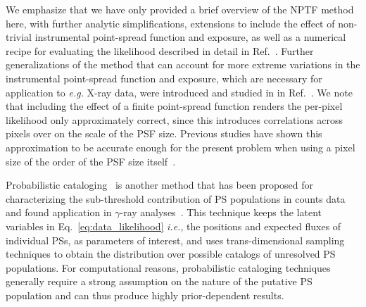 \documentclass[prd,aps,10pt,nofootinbib,twocolumn,superscriptaddress,preprintnumbers,balancelastpage,longbibliography]{revtex4-1}
\begin{document}
We emphasize that we have only provided a brief overview of the NPTF method here, with further analytic simplifications, extensions to include the effect of non-trivial instrumental point-spread function and exposure, as well as a numerical recipe for evaluating the likelihood described in detail in Ref.~\cite{Mishra-Sharma:2016gis}. Further generalizations of the method that can account for more extreme variations in the instrumental point-spread function and exposure, which are necessary for application to \emph{e.g.} X-ray data, were introduced and studied in in Ref.~\cite{Collin:2021ufc}. We note that including the effect of a finite point-spread function renders the per-pixel likelihood only approximately correct, since this introduces correlations across pixels over on the scale of the PSF size. Previous studies have shown this approximation to be accurate enough for the present problem when using a pixel size of the order of the PSF size itself~\cite{Chang:2019ars}. 

Probabilistic cataloging~\cite{2013AJ....146....7B,2021arXiv210202409L} is another method that has been proposed for characterizing the sub-threshold contribution of PS populations in counts data and found application in $\gamma$-ray analyses~\cite{Daylan:2016tia}. This technique keeps the latent variables in Eq.~\eqref{eq:data_likelihood} \emph{i.e.}, the positions and expected fluxes of individual PSs, as parameters of interest, and uses trans-dimensional sampling techniques to obtain the distribution over possible catalogs of unresolved PS populations. For computational reasons, probabilistic cataloging techniques generally require a strong assumption on the nature of the putative PS population and can thus produce highly prior-dependent results.

\end{document}
